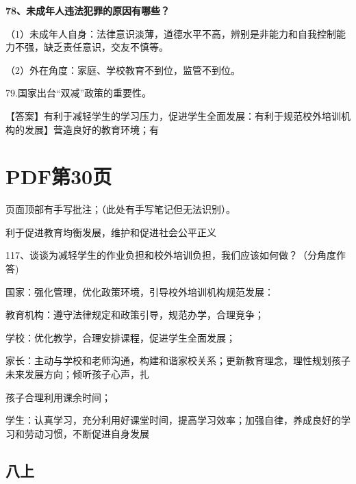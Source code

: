 \documentclass[lang=cn,11pt]{elegantbook}
\begin{document}
\textbf{78、未成年人违法犯罪的原因有哪些？}\par

（1）未成年人自身：法律意识淡薄，道德水平不高，辨别是非能力和自我控制能力不强，缺乏责任意识，交友不慎等。\par

（2）外在角度：家庭、学校教育不到位，监管不到位。\par

79.国家出台“双减”政策的重要性。\par

【答案】有利于减轻学生的学习压力，促进学生全面发展：有利于规范校外培训机构的发展】营造良好的教育环境；有\par


\section*{PDF第30页}

\begin{note}[手写批注]
页面顶部有手写批注；（此处有手写笔记但无法识别）。\par
\end{note}

利于促进教育均衡发展，维护和促进社会公平正义\par

117、谈谈为减轻学生的作业负担和校外培训负担，我们应该如何做？（分角度作答)\par

国家：强化管理，优化政策环境，引导校外培训机构规范发展：\par

教育机构：遵守法律规定和政策引导，规范办学，合理竞争；\par

学校：优化教学，合理安排课程，促进学生全面发展；\par

家长：主动与学校和老师沟通，构建和谐家校关系；更新教育理念，理性规划孩子未来发展方向；倾听孩子心声，扎\par

孩子合理利用课余时间；\par

学生：认真学习，充分利用好课堂时间，提高学习效率；加强自律，养成良好的学习和劳动习惯，不断促进自身发展\par

\subsection*{八上}
\end{document}
